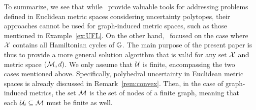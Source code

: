 \documentclass[12pt]{article}
\newcommand{\blue}[1]{{\color{black}#1}}
\begin{document}
To summarize, we see that while~\cite{zhen2021robust} provide valuable tools for addressing problems defined in Euclidean metric spaces considering uncertainty polytopes, their approaches cannot be used for graph-induced metric spaces, such as those mentioned in Example~\ref{ex:UFL}. %
On the other hand,~\cite{citovsky2017tsp} focused on the case where $\mathcal{X}$ contains all Hamiltonian cycles of $\mathbb{G}$. 
The main purpose of the present paper is thus to provide a more general solution algorithm that is valid for any set $\mathcal{X}$ and metric space $(\mathcal{M},d)$. 
We only assume that $\mathcal{U}$ is finite, encompassing the two cases mentioned above. \blue{Specifically, polyhedral uncertainty in Euclidean metric spaces is already discussed in Remark~\ref{rem:convex}.} Then, in the case of graph-induced metrics, the set $\mathcal{M}$ is the set of nodes of a finite graph, meaning that each $\mathcal{U}_i\subseteq \mathcal{M}$ must be finite as well.
\end{document}
